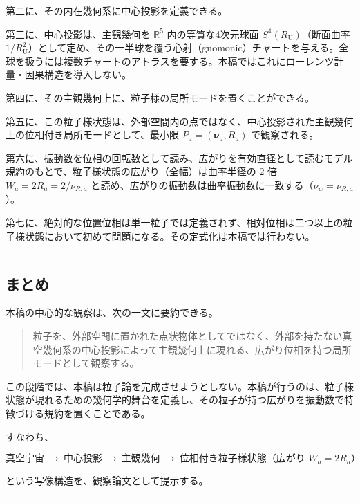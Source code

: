 \documentclass[
]{ltjsarticle}
\begin{document}
第二に、その内在幾何系に中心投影を定義できる。

第三に、中心投影は、主観幾何を \(\mathbb{R}^5\) 内の等質な4次元球面
\(S^4(R_{\mathrm U})\)（断面曲率
\(1/R_{\mathrm U}^2\)）として定め、その一半球を覆う心射（gnomonic）チャートを与える。全球を扱うには複数チャートのアトラスを要する。本稿ではこれにローレンツ計量・因果構造を導入しない。

第四に、その主観幾何上に、粒子様の局所モードを置くことができる。

第五に、この粒子様状態は、外部空間内の点ではなく、中心投影された主観幾何上の位相付き局所モードとして、最小限
\(P_a=(\boldsymbol{\nu}_a,R_a)\) で観察される。

第六に、振動数を位相の回転数として読み、広がりを有効直径として読むモデル規約のもとで、粒子様状態の広がり（全幅）は曲率半径の
2 倍 \(W_a=2R_a=2/\nu_{R,a}\)
と読め、広がりの振動数は曲率振動数に一致する（\(\nu_w=\nu_{R,a}\)）。

第七に、絶対的な位置位相は単一粒子では定義されず、相対位相は二つ以上の粒子様状態において初めて問題になる。その定式化は本稿では行わない。

\begin{center}\rule{0.5\linewidth}{0.5pt}\end{center}

\subsection{まとめ}\label{ux307eux3068ux3081}

本稿の中心的な観察は、次の一文に要約できる。

\begin{quote}
粒子を、外部空間に置かれた点状物体としてではなく、外部を持たない真空幾何系の中心投影によって主観幾何上に現れる、広がり位相を持つ局所モードとして観察する。
\end{quote}

この段階では、本稿は粒子論を完成させようとしない。本稿が行うのは、粒子様状態が現れるための幾何学的舞台を定義し、その粒子が持つ広がりを振動数で特徴づける規約を置くことである。

すなわち、

\[\text{真空宇宙}\ \rightarrow\ \text{中心投影}\ \rightarrow\ \text{主観幾何}\ \rightarrow\ \text{位相付き粒子様状態（広がり }W_a=2R_a\text{）}\]

という写像構造を、観察論文として提示する。

\begin{center}\rule{0.5\linewidth}{0.5pt}\end{center}
\end{document}
